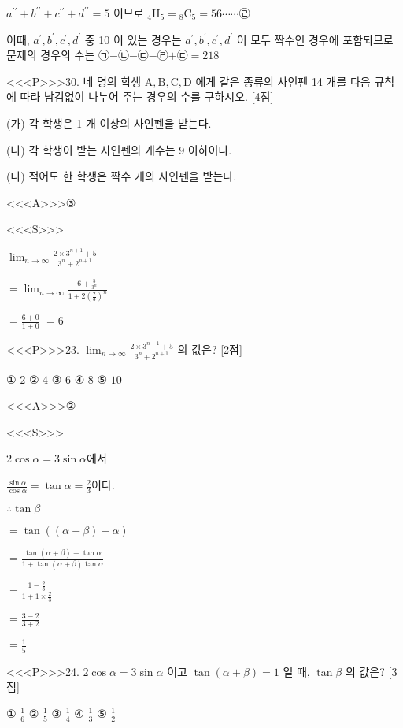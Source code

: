 \documentclass{oblivoir}
\begin{document}
$a^{\prime \prime}+b^{\prime \prime}+c^{\prime \prime}+d^{\prime \prime}=5 $ 이므로
${ }_{4} \mathrm{H}_{5}={ }_{8} \mathrm{C}_{5}=56 \cdots \cdots $㉣

이때, $a^{\prime}, b^{\prime}, c^{\prime}, d^{\prime}$ 중 10 이 있는 경우는 $a^{\prime}, b^{\prime}, c^{\prime}, d^{\prime}$ 이 모두 짝수인 경우에 포함되므로 문제의 경우의 수는 ㉠$-$㉡$-$㉢$-$㉣$+$㉢$=218$


<<<P>>>30. 네 명의 학생 $\mathrm{A}, \mathrm{B}, \mathrm{C}, \mathrm{D}$ 에게 같은 종류의 사인펜 14 개를 다음 규칙에 따라 남김없이 나누어 주는 경우의 수를 구하시오. [4점]

(가) 각 학생은 1 개 이상의 사인펜을 받는다.

(나) 각 학생이 받는 사인펜의 개수는 9 이하이다.

(다) 적어도 한 학생은 짝수 개의 사인펜을 받는다.


<<<A>>>③

<<<S>>>





$\lim _{n \rightarrow \infty} \frac{2 \times 3^{n+1}+5}{3^{n}+2^{n+1}}$

$=\lim _{n \rightarrow \infty} \frac{6+\frac{5}{3^{n}}}{1+2\left(\frac{2}{3}\right)^{n}}$

$=\frac{6+0}{1+0}$
$=6$


<<<P>>>23. $\lim _{n \rightarrow \infty} \frac{2 \times 3^{n+1}+5}{3^{n}+2^{n+1}}$ 의 값은? [2점]

① $2$
② $4$
③ $6$
④ $8$
⑤ $10$


<<<A>>>②

<<<S>>>



$ 2 \cos \alpha =3 \sin \alpha$에서 

$\frac{\sin \alpha}{\cos \alpha}=\tan \alpha=\frac{2}{3}$이다.

$\therefore \tan \beta$

$=\tan ((\alpha+\beta)-\alpha)$

$=\frac{\tan (\alpha+\beta)-\tan \alpha}{1+\tan (\alpha+\beta) \tan \alpha}$

$= \frac{1-\frac{2}{3}}{1+1 \times \frac{2}{3}}$

$=\frac{3-2}{3+2}$

$=\frac{1}{5} $


<<<P>>>24. $2 \cos \alpha=3 \sin \alpha$ 이고 $\tan (\alpha+\beta)=1$ 일 때, $\tan \beta$ 의 값은?
[3점]

① $\frac{1}{6}$
② $\frac{1}{5}$
③ $\frac{1}{4}$
④ $\frac{1}{3}$
⑤ $\frac{1}{2}$
\end{document}
